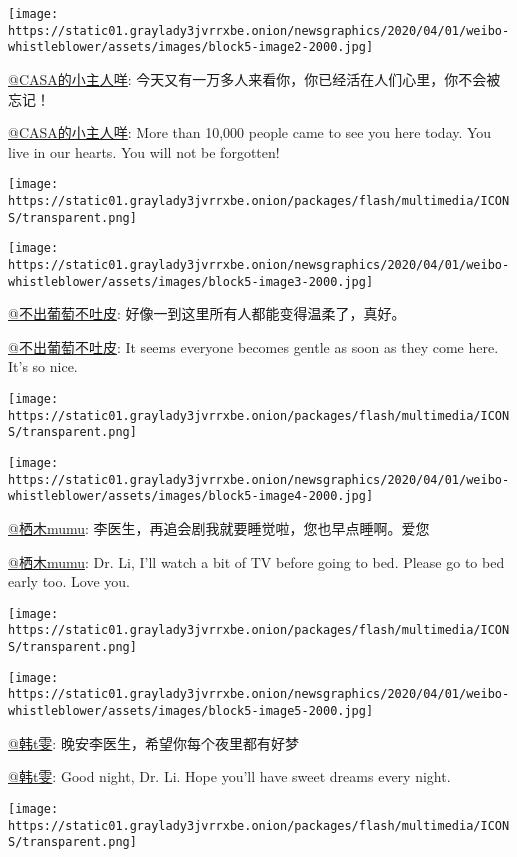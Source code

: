 \texttt{[image: https://static01.graylady3jvrrxbe.onion/newsgraphics/2020/04/01/weibo-whistleblower/assets/images/block5-image2-2000.jpg]}

\href{https://www.weibo.com/u/3327886222}{@CASA的小主人咩}:
今天又有一万多人来看你，你已经活在人们心里，你不会被忘记！

\href{https://www.weibo.com/u/3327886222}{@CASA的小主人咩}: More than
10,000 people came to see you here today. You live in our hearts. You
will not be forgotten!

\texttt{[image: https://static01.graylady3jvrrxbe.onion/packages/flash/multimedia/ICONS/transparent.png]}

\texttt{[image: https://static01.graylady3jvrrxbe.onion/newsgraphics/2020/04/01/weibo-whistleblower/assets/images/block5-image3-2000.jpg]}

\href{https://www.weibo.com/u/3626405707}{@不出葡萄不吐皮}:
好像一到这里所有人都能变得温柔了，真好。

\href{https://www.weibo.com/u/3626405707}{@不出葡萄不吐皮}: It seems
everyone becomes gentle as soon as they come here. It's so nice.

\texttt{[image: https://static01.graylady3jvrrxbe.onion/packages/flash/multimedia/ICONS/transparent.png]}

\texttt{[image: https://static01.graylady3jvrrxbe.onion/newsgraphics/2020/04/01/weibo-whistleblower/assets/images/block5-image4-2000.jpg]}

\href{https://weibo.com/6899291211}{@栖木mumu}:
李医生，再追会剧我就要睡觉啦，您也早点睡啊。爱您

\href{https://weibo.com/6899291211}{@栖木mumu}: Dr. Li, I'll watch a bit
of TV before going to bed. Please go to bed early too. Love you.

\texttt{[image: https://static01.graylady3jvrrxbe.onion/packages/flash/multimedia/ICONS/transparent.png]}

\texttt{[image: https://static01.graylady3jvrrxbe.onion/newsgraphics/2020/04/01/weibo-whistleblower/assets/images/block5-image5-2000.jpg]}

\href{https://www.weibo.com/yiliminsu?is_hot=1}{@韩t雯}:
晚安李医生，希望你每个夜里都有好梦

\href{https://www.weibo.com/yiliminsu?is_hot=1}{@韩t雯}: Good night, Dr.
Li. Hope you'll have sweet dreams every night.

\texttt{[image: https://static01.graylady3jvrrxbe.onion/packages/flash/multimedia/ICONS/transparent.png]}

